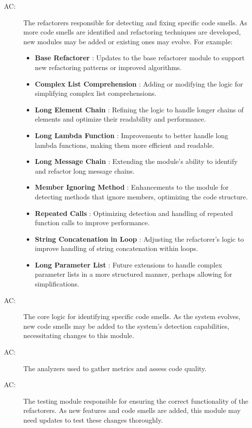 \documentclass[12pt, titlepage]{article}
\newcounter{acnum}
\newcommand{\actheacnum}{AC\theacnum}
\begin{document}
\begin{description}
  \item[ \actheacnum \label{acRefactorers}:] The refactorers responsible
    for detecting and fixing specific code smells. As more code smells are identified
    and refactoring techniques are developed, new modules may be added or existing
    ones may evolve. For example:
    \begin{itemize}
      \item \textbf{Base Refactorer} \label{acBaseRefactorer}: Updates to the base refactorer module to
      support new refactoring patterns or improved algorithms.
      \item \textbf{Complex List Comprehension} \label{acComplexListComprehension}: Adding or modifying
      the logic for simplifying complex list comprehensions.
      \item \textbf{Long Element Chain} \label{acLongElementChain}: Refining the logic to handle longer
      chains of elements and optimize their readability and performance.
      \item \textbf{Long Lambda Function} \label{acLongLambdaFunction}: Improvements to better handle
      long lambda functions, making them more efficient and readable.
      \item \textbf{Long Message Chain} \label{acLongMessageChain}: Extending the module's ability
      to identify and refactor long message chains.
      \item \textbf{Member Ignoring Method} \label{acMemberIgnoringMethod}: Enhancements to the
      module for detecting methods that ignore members, optimizing the code structure.
      \item \textbf{Repeated Calls} \label{acRepeatedCalls}: Optimizing detection and handling
      of repeated function calls to improve performance.
      \item \textbf{String Concatenation in Loop} \label{acStringConcatenationInLoop}: Adjusting
      the refactorer's logic to improve handling of string concatenation within loops.
      \item \textbf{Long Parameter List} \label{acLongParameterList}: Future extensions to handle
      complex parameter lists in a more structured manner, perhaps allowing for simplifications.
    \end{itemize}
    
  \item[ \actheacnum \label{acSmell}:] The core logic
    for identifying specific code smells. As the system evolves, new code smells may be added to the system’s detection capabilities, necessitating changes to this module.
  
  \item[ \actheacnum \label{acAnalyzer}:] The analyzers used to
    gather metrics and assess code quality.
  
  \item[ \actheacnum \label{acTesting}:] The testing module
    responsible for ensuring the correct functionality of the refactorers. As new
    features and code smells are added, this module may need updates to test these
    changes thoroughly.
\end{description}  
\end{document}
